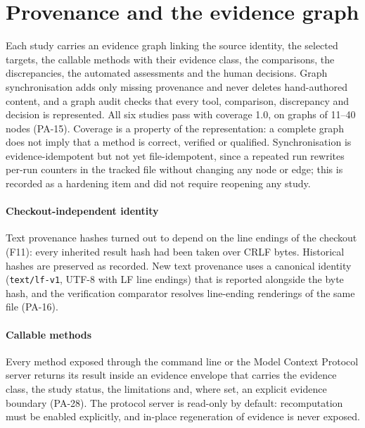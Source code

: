 \section{Provenance and the evidence graph}
\label{sec:provenance}

Each study carries an evidence graph linking the source identity, the selected targets, the callable methods with their evidence class, the comparisons, the discrepancies, the automated assessments and the human decisions. Graph synchronisation adds only missing provenance and never deletes hand-authored content, and a graph audit checks that every tool, comparison, discrepancy and decision is represented. All six studies pass with coverage 1.0, on graphs of 11--40 nodes (PA-15). Coverage is a property of the representation: a complete graph does not imply that a method is correct, verified or qualified. Synchronisation is evidence-idempotent but not yet file-idempotent, since a repeated run rewrites per-run counters in the tracked file without changing any node or edge; this is recorded as a hardening item and did not require reopening any study.

\paragraph{Checkout-independent identity}
Text provenance hashes turned out to depend on the line endings of the checkout (F11): every inherited result hash had been taken over CRLF bytes. Historical hashes are preserved as recorded. New text provenance uses a canonical identity (\texttt{text/lf-v1}, UTF-8 with LF line endings) that is reported alongside the byte hash, and the verification comparator resolves line-ending renderings of the same file (PA-16).

\paragraph{Callable methods}
Every method exposed through the command line or the Model Context Protocol server returns its result inside an evidence envelope that carries the evidence class, the study status, the limitations and, where set, an explicit evidence boundary (PA-28). The protocol server is read-only by default: recomputation must be enabled explicitly, and in-place regeneration of evidence is never exposed.
